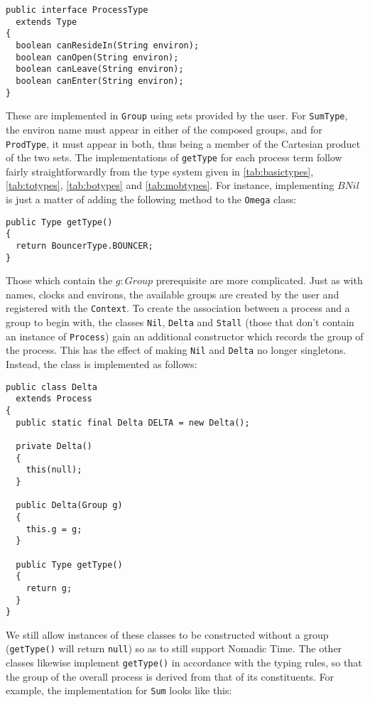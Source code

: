 \begin{verbatim}
public interface ProcessType
  extends Type
{
  boolean canResideIn(String environ);
  boolean canOpen(String environ);
  boolean canLeave(String environ);
  boolean canEnter(String environ);
}
\end{verbatim}

These are implemented in \texttt{Group} using sets provided by the
user.  For \texttt{SumType}, the environ name must appear in either of
the composed groups, and for \texttt{ProdType}, it must appear in
both, thus being a member of the Cartesian product of the two sets.
The implementations of \texttt{getType} for each process term follow
fairly straightforwardly from the type system given in
\ref{tab:basictypes}, \ref{tab:totypes}, \ref{tab:botypes} and
\ref{tab:mobtypes}.  For instance, implementing $BNil$ is just a
matter of adding the following method to the \texttt{Omega} class:

\begin{verbatim}
public Type getType()
{
  return BouncerType.BOUNCER;
}
\end{verbatim}

Those which contain the $g : Group$ prerequisite are more complicated.
Just as with names, clocks and environs, the available groups are
created by the user and registered with the \texttt{Context}.  To
create the association between a process and a group to begin with,
the classes \texttt{Nil}, \texttt{Delta} and \texttt{Stall} (those
that don't contain an instance of \texttt{Process}) gain an additional
constructor which records the group of the process.  This has the
effect of making \texttt{Nil} and \texttt{Delta} no longer singletons.
Instead, the class is implemented as follows:

\begin{verbatim}
public class Delta
  extends Process
{
  public static final Delta DELTA = new Delta();

  private Delta() 
  { 
    this(null); 
  }
  
  public Delta(Group g) 
  { 
    this.g = g; 
  }

  public Type getType()
  {
    return g;
  }
}
\end{verbatim}

We still allow instances of these classes to be constructed without a
group (\texttt{getType()} will return \texttt{null}) so as to still
support Nomadic Time.  The other classes likewise implement
\texttt{getType()} in accordance with the typing rules, so that the
group of the overall process is derived from that of its constituents.
For example, the implementation for \texttt{Sum} looks like this:

